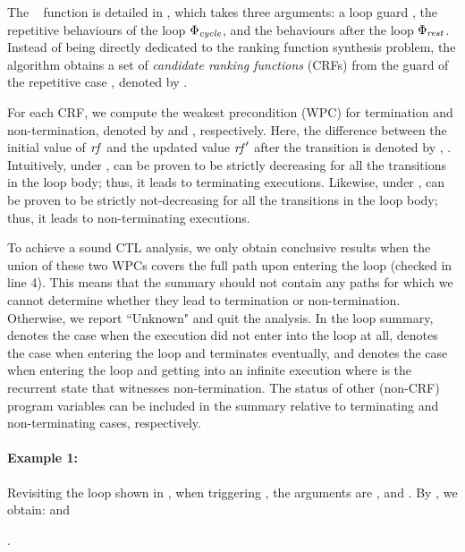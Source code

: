 {The \loopsummary~ function is detailed in 
, which takes three arguments: a loop guard , the repetitive behaviours of the loop ${\mathrm{\Phi}}_{\mathit{cycle}}$, and the behaviours after the loop ${\mathrm{\Phi}}_{\mathit{rest}}$. 
Instead of being directly dedicated to the ranking function synthesis problem, the algorithm obtains a set of \emph{candidate ranking functions} (CRFs) from the guard of the repetitive case , denoted by . 




  

For each CRF, we compute the weakest precondition (WPC) for termination and non-termination, denoted by 
 and , respectively. 
Here, the difference between the initial value of $\mathit{rf}$ and the updated value $\mathit{rf}^\prime$ after the transition \code{\effect} is denoted by , \ie {}. 
Intuitively, under ,  can be proven to be strictly decreasing for all the transitions in the loop body; thus, it leads to terminating executions. 
Likewise, under ,  can be proven to be strictly not-decreasing for all the transitions in the loop body; thus, it leads to non-terminating executions. 




To achieve a sound CTL analysis, we only obtain conclusive results when the union of these two WPCs covers the full path upon entering the loop (checked in line 4). 
This means that the summary should not contain any paths for which we cannot determine whether they lead to termination or non-termination. 
Otherwise, we report ``Unknown" and quit the analysis. In the loop summary,  denotes the case when the execution did not enter into the loop at all,   denotes the case when entering the loop and terminates eventually, and  denotes the case when entering the loop and getting into an infinite execution where  is the recurrent state \cite{DBLP:conf/sas/Ben-AmramDG19} that witnesses non-termination. 
The status of other (non-CRF) program variables can be included in the summary relative to terminating and non-terminating cases, respectively. 



\paragraph*{\textbf{Example 1: }} 
\label{sec:example1}
Revisiting the loop shown in , when triggering \loopsummary, the arguments are ,  and  . 
By , we obtain: 
 and }. 
